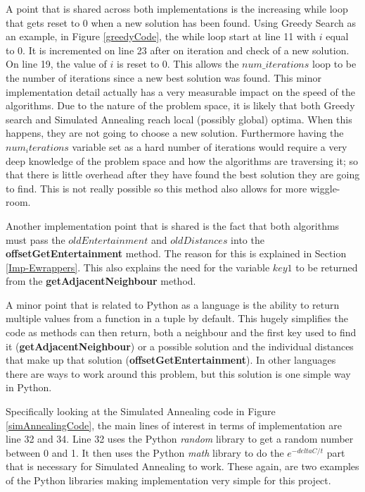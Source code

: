 \documentclass[12pt]{report}
\begin{document}
A point that is shared across both implementations is the increasing while loop that gets reset to 0 when a new solution has been found. Using Greedy Search as an example, in Figure \ref{greedyCode}, the while loop start at line 11 with $i$ equal to 0. It is incremented on line 23 after on iteration and check of a new solution. On line 19, the value of $i$ is reset to 0. This allows the $num\_iterations$ loop to be the number of iterations since a new best solution was found. This minor implementation detail actually has a very measurable impact on the speed of the algorithms. Due to the nature of the problem space, it is likely that both Greedy search and Simulated Annealing reach local (possibly global) optima. When this happens, they are not going to choose a new solution. Furthermore having the $num_iterations$ variable set as a hard number of iterations would require a very deep knowledge of the problem space and how the algorithms are traversing it; so that there is little overhead after they have found the best solution they are going to find. This is not really possible so this method also allows for more wiggle-room.

Another implementation point that is shared is the fact that both algorithms must pass the $oldEntertainment$ and $oldDistances$ into the \textbf{offsetGetEntertainment} method. The reason for this is explained in Section \ref{Imp-Ewrappers}. This also explains the need for the variable $key1$ to be returned from the \textbf{getAdjacentNeighbour} method. 

A minor point that is related to Python as a language is the ability to return multiple values from a function in a tuple by default. This hugely simplifies the code as methods can then return, both a neighbour and the first key used to find it (\textbf{getAdjacentNeighbour}) or a possible solution and the individual distances that make up that solution (\textbf{offsetGetEntertainment}). In other languages there are ways to work around this problem, but this solution is one simple way in Python.

Specifically looking at the Simulated Annealing code in Figure \ref{simAnnealingCode}, the main lines of interest in terms of implementation are line 32 and 34. Line 32 uses the Python \textit{random}\cite{PythonRandom} library to get a random number between 0 and 1. It then uses the Python \textit{math}\cite{PythonMath} library to do the $e^{-deltaC/t}$ part that is necessary for Simulated Annealing to work. These again, are two examples of the Python libraries making implementation very simple for this project. 
\end{document}
